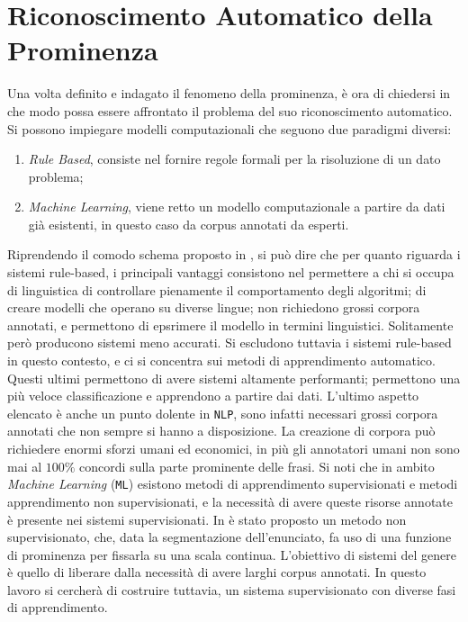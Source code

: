 \documentclass[twoside,twocolumn,10pt]{extarticle}
\theoremstyle{definition}
\begin{document}
\section{Riconoscimento Automatico della Prominenza}\label{sec:ric}
	Una volta definito e indagato il fenomeno della prominenza, è ora di chiedersi in che modo possa essere affrontato il problema del suo riconoscimento automatico. Si possono impiegare modelli computazionali che seguono due paradigmi diversi:
	\begin{enumerate}
		\item \textit{Rule Based}, consiste nel fornire regole formali per la risoluzione di un dato problema;
		\item \textit{Machine Learning}, viene retto un modello computazionale a partire da dati già esistenti, in questo caso da corpus annotati da esperti. 
	\end{enumerate}
	Riprendendo il comodo schema proposto in \cite{bib:prominence-by-acoustic-analyses}, si può dire che per quanto riguarda i sistemi rule-based, i principali vantaggi consistono nel permettere a chi si occupa di linguistica di controllare pienamente il comportamento degli algoritmi; di creare modelli che operano su diverse lingue; non richiedono grossi corpora annotati, e permettono di epsrimere il modello in termini linguistici. Solitamente però producono sistemi meno accurati. Si escludono tuttavia i sistemi rule-based in questo contesto, e ci si concentra sui metodi di apprendimento automatico. Questi ultimi permettono di avere sistemi altamente performanti; permettono una più veloce classificazione e apprendono a partire dai dati. L'ultimo aspetto elencato è anche un punto dolente in \texttt{NLP}, sono infatti necessari grossi corpora annotati che non sempre si hanno a disposizione. La creazione di corpora può richiedere enormi sforzi umani ed economici, in più gli annotatori umani non sono mai al $100\%$ concordi sulla parte prominente delle frasi. Si noti che in ambito \textit{Machine Learning} (\texttt{ML}) esistono metodi di apprendimento supervisionati e metodi apprendimento non supervisionati, e la necessità di avere queste risorse annotate è presente nei sistemi supervisionati. In \cite[Sezione 4.2]{bib:fenomeni-prosodici-prominenza} è stato proposto un metodo non supervisionato, che, data la segmentazione dell'enunciato, fa uso di una funzione di prominenza per fissarla su una scala continua. L'obiettivo di sistemi del genere è quello di liberare dalla necessità di avere larghi corpus annotati. In questo lavoro si cercherà di costruire tuttavia, un sistema supervisionato con diverse fasi di apprendimento. 
	
\end{document}
